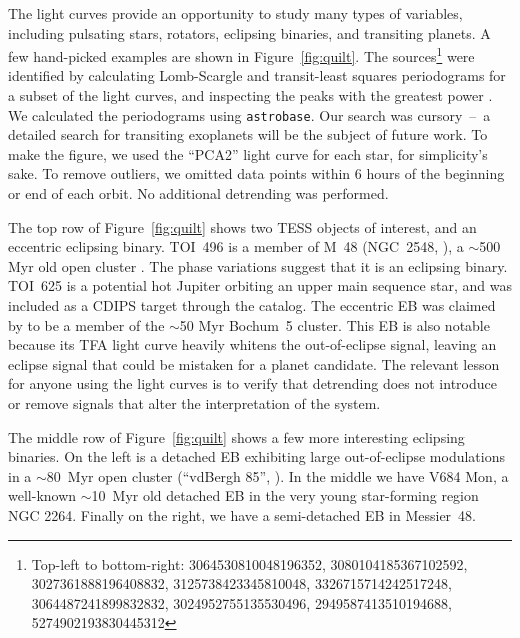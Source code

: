 \documentclass[12pt,twocolumn,tighten]{aastex62}
\begin{document}
The light curves provide an opportunity to study many types of
variables, including pulsating stars, rotators, eclipsing binaries,
and transiting planets.  A few hand-picked examples are shown in
Figure~\ref{fig:quilt}.
The sources\footnote{
	Top-left to bottom-right:
	3064530810048196352, 
	3080104185367102592, 
	3027361888196408832,
	3125738423345810048,
	3326715714242517248,
	3064487241899832832,
	3024952755135530496,
	2949587413510194688, 
	5274902193830445312 
} were identified by calculating Lomb-Scargle and transit-least
squares periodograms for a subset of the light curves, and inspecting
the peaks with the greatest power
\citep{lomb_1976,scargle_studies_1982,kovacs_box-fitting_2002,vanderplas_periodograms_2015,hippke_TLS_2019}.
We calculated the periodograms using \texttt{astrobase}.  Our search
was cursory~--~a detailed search for transiting exoplanets will be the
subject of future work.  To make the figure, we used the ``PCA2''
light curve for each star, for simplicity's sake.  To remove outliers,
we omitted data points within 6 hours of the beginning or end of each
orbit.  No additional detrending was performed.

The top row of Figure~\ref{fig:quilt} shows two TESS objects of
interest, and an eccentric eclipsing binary.  TOI~496 is a member of
M~48 (NGC~2548,
\citealt{gaia_collaboration_gaia_2018,cantat-gaudin_gaia_2018}), a
$\sim$500 Myr old open cluster \citep{Kharchenko_et_al_2013}.  The
phase variations suggest that it is an eclipsing binary.  TOI~625 is a
potential hot Jupiter orbiting an upper main sequence star, and was
included as a CDIPS target through the \citet{zari_3d_2018} catalog.
The eccentric EB was claimed by \citet{dias_proper_2014} to be a
member of the $\sim$50 Myr Bochum~5 cluster.  This EB is also notable
because its TFA light curve heavily whitens the out-of-eclipse signal,
leaving an eclipse signal that could be mistaken for a planet
candidate.  The relevant lesson for anyone using the light curves is
to verify that detrending does not introduce or remove signals that
alter the interpretation of the system.

The middle row of Figure~\ref{fig:quilt} shows a few more interesting
eclipsing binaries.  On the left is a detached EB exhibiting large
out-of-eclipse modulations in a $\sim$80~Myr open cluster (``vdBergh
85'', \citealt{Kharchenko_et_al_2013}).  In the middle we have V684
Mon, a well-known $\sim$10~Myr old detached EB in the very young
star-forming region NGC 2264.  Finally on the right, we have a
semi-detached EB in Messier~48.
\end{document}
